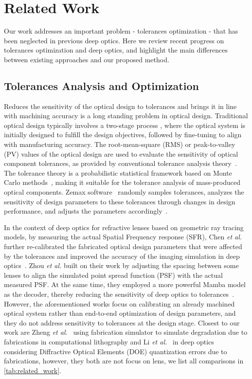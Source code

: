 \section{Related Work}
Our work addresses an important problem - tolerances optimization - that has been neglected in previous deep optics. Here we review recent progress on tolerances optimization and deep optics, and highlight the main differences between existing approaches and our proposed method.

\subsection{Tolerances Analysis and Optimization}
Reduces the sensitivity of the optical design to tolerances and brings it in line with machining accuracy is a long standing problem in optical design. Traditional optical design typically involves a two-stage process \cite{laikin2018lens}, where the optical system is initially designed to fulfill the design objectives, followed by fine-tuning to align with manufacturing accuracy. The root-mean-square (RMS) or peak-to-valley (PV) values of the optical design are used to evaluate the sensitivity of optical component tolerances, as provided by conventional tolerance analysis theory~\cite{ni2019description, maksimovic2016optical, hu2015design}. The tolerance theory is a probabilistic statistical framework based on Monte Carlo methods~\cite{oinen1990new, forse1996statistical}, making it suitable for the tolerance analysis of mass-produced optical components. Zemax software~\cite{ZEMAX}  randomly samples tolerances, analyzes the sensitivity of design parameters to these tolerances through changes in design performance, and adjusts the parameters accordingly~\cite{Synopsys}.

In the context of deep optics for refractive lenses based on geometric ray tracing models, by measuring the actual Spatial Frequency response (SFR), Chen \textit{et al.} further re-calibrated the fabricated optical design parameters that were affected by the tolerances and  improved the accuracy of the imaging simulation in deep optics~\cite{chen2022computational, chen2021optical}. Zhou \textit{et al.} built on their work by adjusting the spacing between some lenses to align the simulated point spread function (PSF) with the actual measured PSF. At the same time, they employed a more powerful Mamba model~\cite{gu2023mamba} as the decoder, thereby reducing the sensitivity of deep optics to tolerances~\cite{zhou2024optical}. However, the aforementioned works focus on calibrating an already machined optical system rather than end-to-end optimization of design parameters, and they do not address sensitivity to tolerances at the design stage. Closest to our work are Zheng \textit{et al.}~\cite{zheng2023neural} using fabrication simulator to simulate degradation due to fabrications in computational lithography and Li \textit{et al.}~\cite{li2022quantization} in deep optics considering Diffractive Optical Elements (DOE) quantization errors due to fabrications, however, they both are not focus on lens, we list all comparisons in \cref{tab:related_work}.

